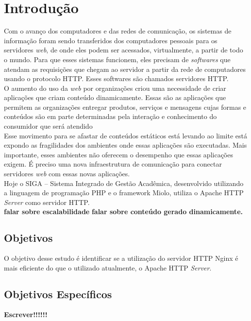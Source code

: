 \chapter{Introdução}\label{introducao}
Com o avanço dos computadores e das redes de comunicação, os sistemas de 
informação foram sendo transferidos dos computadores pessoais para os 
servidores \textit{web}, de onde eles podem ser acessados, virtualmente, a 
partir de todo o mundo. Para que esses sistemas funcionem, eles precisam de 
\textit{softwares} que atendam as requisições que chegam ao servidor a partir 
da rede de computadores usando o protocolo HTTP. Esses softwares são chamados 
servidores HTTP.\\
O aumento do uso da \textit{web} por organizações criou uma necessidade de 
criar aplicações que criam conteúdo dinamicamente. Essas são as aplicações que 
permitem as organizações entregar produtos, serviços e mensagens cujas formas e 
conteúdos são em parte determinadas pela interação e conhecimento do consumidor 
que será atendido\\
Esse movimento para se afastar de conteúdos estáticos está levando ao limite 
está expondo as fragilidades dos ambientes onde essas aplicações são 
executadas. Mais importante, esses ambientes não oferecem o desempenho que 
essas aplicações exigem. É preciso uma nova infraestrutura de comunicação para 
conectar servidores \textit{web} com essas novas aplicações.\\
Hoje o SIGA – Sistema Integrado de Gestão Acadêmica, desenvolvido utilizando a 
linguagem de programação PHP e o framework Miolo, utiliza o Apache HTTP 
\textit{Server} como servidor HTTP.\\
\textbf{falar sobre escalabilidade}
\textbf{falar sobre conteúdo gerado dinamicamente.}
\section{Objetivos}
O objetivo desse estudo é identificar se a utilização do servidor HTTP Nginx é 
mais eficiente do que o utilizado atualmente, o Apache HTTP \textit{Server}.\\
\section{Objetivos Específicos}
\textbf{Escrever!!!!!!}

